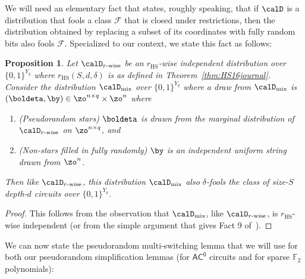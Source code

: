 \documentclass[11pt]{article}
\numberwithin{equation}{section}
\newtheorem{proposition}[theorem]{Proposition}
\theoremstyle{definition}
\theoremstyle{plain}
\theoremstyle{plain}
\newcommand{\acz}{\mathsf{AC^0}}
\renewcommand{\F}{\mathds{F}}
\begin{document}
We will need an elementary fact that states, roughly speaking, that if $\calD$ is a distribution that fools a class $\mathscr{F}$ that is closed under restrictions, then the distribution obtained by replacing a subset of its coordinates with fully random bits also fools $\mathscr{F}$. Specialized to our context, we state this fact as follows: 


\begin{proposition}
\label{prop:swap} 
Let $\calD_{r\text{-}\mathrm{wise}}$ be an $r_{\mathrm{HS}}$-wise independent distribution over $\{0,1\}^{Y_q}$ where $r_{\mathrm{HS}}(S,d,\delta)$ is as defined in Theorem~\ref{thm:HS16journal}.  Consider the distribution $\calD_{\mathrm{mix}}$ over $\{0,1\}^{Y_q}$ where a draw from $\calD_{\mathrm{mix}}$ is $(\boldeta,\by) \in \zo^{n\times q}\times \zo^n$ where 
\begin{enumerate}
\item (Pseudorandom stars) $\boldeta$ is drawn from the marginal distribution of $\calD_{r\text{-}\mathrm{wise}}$ on $\zo^{n\times q}$, and 
\item (Non-stars filled in fully randomly) $\by$ is an independent uniform string drawn from $\zo^n$. 
\end{enumerate} 
Then like $\calD_{r\text{-}\mathrm{wise}}$, this distribution $\calD_{\mathrm{mix}}$ also $\delta$-fools the class of size-$S$ depth-$d$ circuits over $\{0,1\}^{Y_q}$.
\end{proposition} 


\begin{proof}
This follows from the observation that $\calD_{\mathrm{mix}}$, like $\calD_{r\text{-}\mathrm{wise}}$, is $r_{\mathrm{HS}}$-wise independent
(or from the simple argument that gives Fact 9 of~\cite{TX13}). 
\end{proof} 

We can now state the pseudorandom multi-switching lemma that we will use for both our pseudorandom simplification lemmas (for $\acz$ circuits and for sparse $\F_2$ polynomials): 
\end{document}
